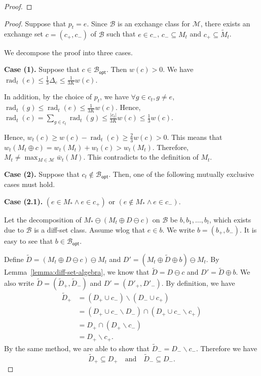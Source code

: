 \documentclass{article}
\newcommand{\M}{\mathcal M}
\newcommand{\B}{\mathcal B}
\newcommand{\del}{\backslash}
\newcommand{\Bopt}{\mathcal B_{\mathsf{opt}}}
\DeclareMathOperator{\rad}{rad}
\begin{document}
\begin{spacing}{1.1}
\begin{proof}
\end{proof}


\begin{proof}
Suppose that $p_t=e$. 
Since $\B$ is an exchange class for $\M$, there exists an exchange set $c=(c_+,c_-)$ of $\B$
such that $e\in c_-$, $c_- \subseteq M_t$ and $c_+ \subseteq \tilde M_t$.

We decompose the proof into three cases.

\textbf{Case (1).} 
Suppose that $c \in\Bopt$. Then $w(c)>0$.
We have $\rad_t(e) \le \frac{1}{3}\Delta_e \le \frac{1}{3K}w(c)$.

In addition, by the choice of $p_t$,  we have $\forall g\in c_t, g\not=e$, $\rad_t(g) \le \rad_t(e)\le \frac{1}{3K}w(c)$.
Hence, $\rad_t(c) = \sum_{g\in c_t} \rad_t(g) \le \frac{|c_t|}{3K}w(c) \le \frac{1}{3}w(c)$.

Hence, $w_t(c) \ge w(c)-\rad_t(c) \ge \frac{2}{3}w(c) > 0$.
This means that $w_t(M_t \oplus c) = w_t(M_t)+w_t(c) > w_t(M_t)$.
Therefore, $M_t \not= \max_{M\in \M} \bar w_t(M)$.
This contradicts to the definition of $M_t$.

\textbf{Case (2).} 
Suppose that $c_t\not\in \Bopt$. Then, one of the following mutually exclusive cases must hold.

\textbf{Case (2.1).} 
$(e \in M_* \wedge e\in c_+)$ or $(e \not \in M_* \wedge e\in c_-)$. 
 
Let the decomposition of $M_* \ominus (M_t \oplus D \ominus c)$ on $\B$ be $b,b_1,\ldots,b_l$, which exists due to $\B$ is a diff-set class. 
Assume wlog that $e\in b$. 
We write $b=(b_+,b_-)$.
It is easy to see that $b \in \Bopt$. 

Define $\tilde D = (M_t \oplus D \ominus c)\ominus M_t$ and $D' = (M_t \oplus \tilde D \oplus b) \ominus M_t$.
By Lemma~\ref{lemma:diff-set-algebra}, we know that $\tilde D = D\ominus c$ and $D'=\tilde D\oplus b$.
We also write $\tilde D=(\tilde D_+, \tilde D_-)$ and $D'= (D'_+, D'_-)$.
By definition, we have 
\begin{align*}
	\tilde D_+ &= (D_+ \cup c_-)\del (D_- \cup c_+)\\
	           &= (D_+\cup c_-\del D_-) \cap (D_+\cup c_-\del c_+)\\
	           &= D_+ \cap (D_+\del c_-) \\
	           &= D_+\del c_+.
\end{align*}
By the same method, we are able to show that $\tilde D_-=D_-\del c_-$.
Therefore we have 
\begin{equation}
\label{eq:2.1.0.1}
\tilde D_+\subseteq D_+\quad\text{and}\quad\tilde D_-\subseteq D_-.
\end{equation}


\end{proof}
\end{spacing}
\end{document}
